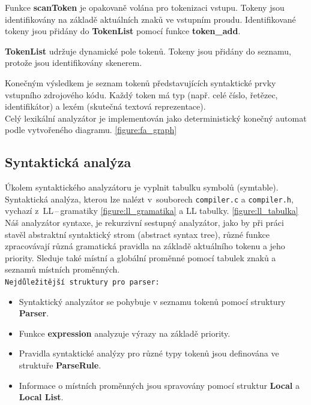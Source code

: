 \documentclass[a4paper, 11pt]{article}
\begin{document}
        Funkce \textbf{scanToken} je opakovaně volána pro tokenizaci vstupu.
        Tokeny jsou identifikovány na základě aktuálních znaků ve vstupním proudu.
        Identifikované tokeny jsou přidány do \textbf{TokenList} pomocí funkce \textbf{token\_add}.
        
        \textbf{TokenList} udržuje dynamické pole tokenů.
        Tokeny jsou přidány do seznamu, protože jsou identifikovány skenerem.
        
        Konečným výsledkem je seznam tokenů představujících syntaktické prvky vstupního zdrojového kódu.
        Každý token má typ (např. celé číslo, řetězec, identifikátor) a lexém (skutečná textová reprezentace).
        \\

	Celý lexikální analyzátor je implementován jako deterministický konečný automat podle vytvořeného diagramu. \ref{figure:fa_graph}


	\subsection{Syntaktická analýza}

        Úkolem syntaktického analyzátoru je vyplnit tabulku symbolů (symtable). Syntaktická analýza, kterou lze nalézt v~souborech \verb|compiler.c| a \verb|compiler.h|, vychazí z~LL\,--\,gramatiky \ref{figure:ll_gramatika} a LL tabulky. \ref{figure:ll_tabulka}
\\


Náš analyzátor syntaxe, je rekurzivní sestupný analyzátor, jako by při práci stavěl abstraktní syntaktický strom (abstract syntax tree), různé funkce zpracovávají různá gramatická pravidla na základě aktuálního tokenu a jeho priority. Sleduje také místní a globální proměnné pomocí tabulek znaků a seznamů místních proměnných.
\\

\verb|Nejdůležitější struktury pro parser:|
\begin{itemize}
    \item Syntaktický analyzátor se pohybuje v seznamu tokenů pomocí struktury \textbf{Parser}.
    \item Funkce \textbf{expression} analyzuje výrazy na základě priority.
   \item  Pravidla syntaktické analýzy pro různé typy tokenů jsou definována ve struktuře \textbf{ParseRule}.
    \item Informace o místních proměnných jsou spravovány pomocí struktur \textbf{Local} a \textbf{Local List}.
\end{itemize}
\end{document}
